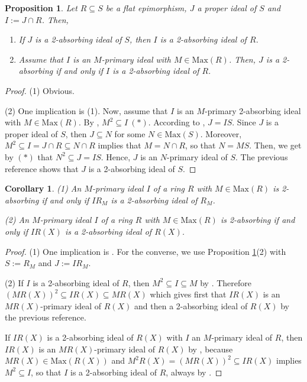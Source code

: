 \documentclass[12pt,leqno]{amsart}
\newtheorem{proposition}[theorem]{Proposition}
\newtheorem{corollary}[theorem]{Corollary}
\theoremstyle{definition}
\begin{document}
\begin{proposition}\label{5.11} Let $R\subseteq S$ be a flat epimorphism, $J$ a proper ideal of $S$ and $I:=J\cap R$. Then, 
\begin{enumerate}
\item If $J$ is a 2-absorbing ideal of $S$, then $I$ is a 2-absorbing ideal of $R$. 
\item Assume that $I$ is an $M$-primary ideal with $M\in\mathrm{Max}(R)$. Then, $J$ is a 2-absorbing  if and only if $I$ is a 2-absorbing ideal of $R$.
\end{enumerate}
\end{proposition}
\begin{proof} (1) Obvious.

(2) One implication is (1). Now, assume that $I$ is an $M$-primary 2-absorbing ideal with $M\in\mathrm{Max}(R)$. By \cite[Theorem 3.1]{Ba}, $ M^2\subseteq I\ (*)$. According to \cite[Scholium A (6)]{Pic 5}, $J=IS$. Since $J$ is a proper ideal of $S$, then $J\subseteq N$ for some   $N\in \mathrm{Max}(S)$. Moreover, $M^2\subseteq I=J\cap R\subseteq N\cap R$ implies that $M=N\cap R$, so that $N=MS$. Then, we get by $(*)$ that $ N^2\subseteq J=IS$. Hence, $J$ is an $N$-primary ideal of $S$. The previous reference shows that  $J$ is a 2-absorbing ideal of $S$.
\end{proof} 

\begin{corollary}\label{5.12} (1) An $M$-primary ideal $I$ of a ring $R$ with $M\in\mathrm{Max}(R)$ is 2-absorbing if and only if $IR_M$ is a 2-absorbing ideal of $R_M$.

(2) An $M$-primary ideal $I$ of a ring $R$ with $M\in\mathrm{Max}(R)$ is  2-absorbing if and only if $IR(X)$ is a 2-absorbing ideal of $R(X)$.
\end{corollary}
\begin{proof} (1) One implication is \cite[Lemma 3.13]{Ba}. For the converse, we use Proposition \ref{5.11}(2) with $S:=R_M$ and $J:=IR_ M$.

(2) If $I$ is a 2-absorbing ideal of $R$, then $M^2\subseteq I\subseteq M$ by \cite[Theorem 3.1]{Ba}. Therefore $(MR(X))^2\subseteq IR(X)\subseteq MR(X) $ which gives first that $IR(X)$ is an $MR(X)$-primary ideal of $R(X)$ and then a 2-absorbing ideal of $R(X)$ by the previous reference.

If $IR(X)$ is a 2-absorbing ideal of $R(X)$ with $I$ an $M$-primary ideal of $R$, then $IR(X)$ is an $MR(X)$-primary ideal of $R(X)$ by \cite[Corollary 1, p.153]{ZS}, because $MR(X)\in\mathrm{Max}(R(X))$ and $M^2R(X)=(M R(X))^2\subseteq IR(X)$ implies $M^2\subseteq I$, so that $I$ is a 2-absorbing ideal of $R$, always by \cite[Theorem 3.1]{Ba}.
\end{proof} 
\end{document}
